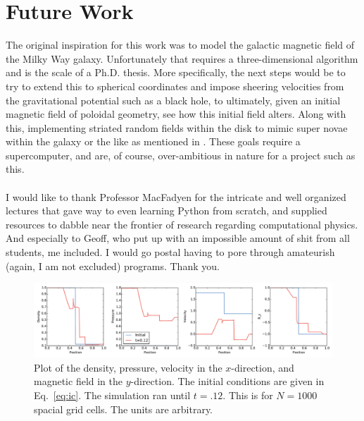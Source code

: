\documentclass[iop,twocolumn]{emulateapj}
\begin{document}
\section{Future Work}
The original inspiration for this work was to model the galactic magnetic field of the Milky Way galaxy. Unfortunately that requires a three-dimensional algorithm and is the scale of a Ph.D. thesis. More specifically, the next steps would be to try to extend this to spherical coordinates and impose sheering velocities from the gravitational potential such as a black hole, to ultimately, given an initial magnetic field of poloidal geometry, see how this initial field alters. Along with this, implementing striated random fields within the disk to mimic super novae within the galaxy or the like as mentioned in \cite{jansson12a}. These goals require a supercomputer, and are, of course, over-ambitious in nature for a project such as this.\\
\vspace{.1cm}
\\
I would like to thank Professor MacFadyen for the intricate and well organized lectures that gave way to even learning Python from scratch, and supplied resources to dabble near the frontier of research regarding computational physics. And especially to Geoff, who put up with an impossible amount of shit from all students, me included. I would go postal having to pore through amateurish (again, I am not excluded) programs. Thank you.
\begin{figure}[htb!]
\includegraphics[scale=.45,trim=0cm 0cm 0cm 0cm,clip]{f1.pdf}
\caption{Plot of the density, pressure, velocity in the $x$-direction, and magnetic field in the $y$-direction. The initial conditions are given in Eq.~\ref{eq:ic}. The simulation ran until $t=.12$. This is for $N=1000$ spacial grid cells. The units are arbitrary. \label{fig:f1}}
\end{figure}
\end{document}
